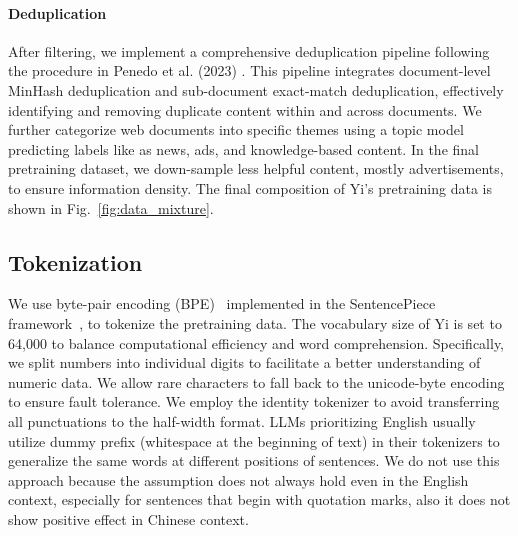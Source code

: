 \documentclass[numbers,sort&compress]{article}
\begin{document}
\paragraph{Deduplication} 
After filtering, we implement a comprehensive deduplication pipeline following the procedure in Penedo et al. (2023) \citep{penedo2023refinedweb}. This pipeline integrates document-level MinHash deduplication and sub-document exact-match deduplication, effectively identifying and removing duplicate content within and across documents. We further categorize web documents into specific themes using a topic model predicting labels like as news, ads, and knowledge-based content. In the final pretraining dataset, we down-sample less helpful content, mostly advertisements, to ensure information density. The final composition of Yi's pretraining data  is shown in Fig.~\ref{fig:data_mixture}.

\subsection{Tokenization}
We use byte-pair encoding (BPE)~\citep{shibata1999byte} implemented in the SentencePiece framework~\citep{kudo2018sentencepiece}, to tokenize the pretraining data.
The vocabulary size of Yi is set to 64,000 to balance computational efficiency and word comprehension.
Specifically, we split numbers into individual digits to facilitate a better understanding of numeric data.
We allow rare characters to fall back to the unicode-byte encoding to ensure fault tolerance.
We employ the identity tokenizer to avoid transferring all punctuations to the half-width format.
LLMs prioritizing English usually utilize dummy prefix (whitespace at the beginning of text) in their tokenizers to generalize the same words at different positions of sentences.
We do not use this approach because the assumption does not always hold even in the English context, especially for sentences that begin with quotation marks, also it does not show positive effect in Chinese context.
\end{document}
